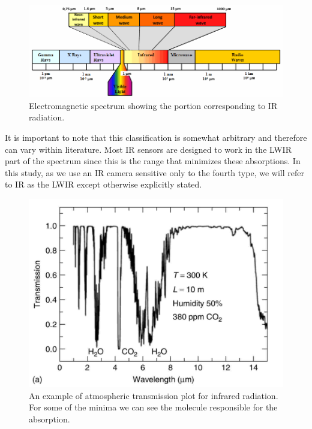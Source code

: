 		\begin{figure}[ht!]
			\centering
			\captionsetup{justification=centering,margin=2cm}
			\includegraphics[scale=0.75]{Figures/Chapter01/Spectrum-of-electromagnetic-radiation.png}
			\caption{Electromagnetic spectrum showing the portion corresponding to IR radiation.}\label{fig1.1}
		\end{figure}
		
		It is important to note that this classification is somewhat arbitrary and therefore can vary within literature. Most IR sensors are designed to work in the LWIR part of the spectrum since this is the range that minimizes these absorptions. In this study, as we use an IR camera sensitive only to the fourth type, we will refer to IR as the LWIR except otherwise explicitly stated.
				
		\begin{figure}[ht!]
			\centering
			\captionsetup{justification=centering,margin=2cm}
			\includegraphics[scale=0.35]{Figures/Chapter01/Transmission.jpg}
			\caption{An example of atmospheric transmission plot for infrared radiation. For some of the minima we can see the molecule responsible for the absorption.}\label{fig1.2}
		\end{figure}
		
